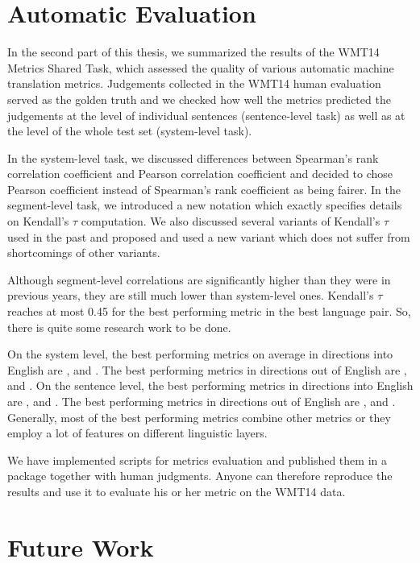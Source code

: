 \section{Automatic Evaluation}

In the second part of this thesis, we summarized the results of the WMT14
Metrics Shared Task, which assessed the quality of various automatic machine
translation metrics. Judgements collected in the WMT14 human evaluation served
as the golden truth and we checked how well the metrics predicted the
judgements at the level of individual sentences (sentence-level task) as well
as at the level of the whole test set (system-level task).

In the system-level task, we discussed differences between Spearman's rank
correlation coefficient and Pearson correlation coefficient and decided to
chose Pearson coefficient instead of Spearman's rank coefficient as being
fairer. In the segment-level task, we introduced a new notation which exactly
specifies details on Kendall's $\tau$ computation. We also discussed several
variants of Kendall's $\tau$ used in the past and proposed and used a new
variant which does not suffer from shortcomings of other variants.

Although segment-level correlations are significantly higher than they were in
previous years, they are still much lower than system-level ones. Kendall's
$\tau$ reaches at most 0.45 for the best performing metric in the best language
pair. So, there is quite some research work to be done.

On the system level, the best performing metrics on average in directions into
English are ,  and
. The best performing metrics in directions out of English
are ,  and . On the sentence level, the
best performing metrics in directions into English are
,  and . The best
performing metrics in directions out of English are ,
 and .  Generally, most of the best performing
metrics combine other metrics or they employ a lot of features on different
linguistic layers.

We have implemented scripts for metrics evaluation and published them in a
package together with human judgments. Anyone can therefore reproduce the
results and use it to evaluate his or her metric on the WMT14 data.

\section{Future Work}

